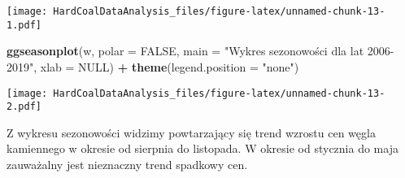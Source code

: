 \documentclass[
]{article}
\newenvironment{Shaded}{\begin{snugshade}}{\end{snugshade}}
\newcommand{\AttributeTok}[1]{\textcolor[rgb]{0.13,0.29,0.53}{#1}}
\newcommand{\ConstantTok}[1]{\textcolor[rgb]{0.56,0.35,0.01}{#1}}
\newcommand{\FunctionTok}[1]{\textcolor[rgb]{0.13,0.29,0.53}{\textbf{#1}}}
\newcommand{\NormalTok}[1]{#1}
\newcommand{\SpecialCharTok}[1]{\textcolor[rgb]{0.81,0.36,0.00}{\textbf{#1}}}
\newcommand{\StringTok}[1]{\textcolor[rgb]{0.31,0.60,0.02}{#1}}
\begin{document}
\texttt{[image: HardCoalDataAnalysis\_files/figure-latex/unnamed-chunk-13-1.pdf]}

\begin{Shaded}
\begin{Highlighting}[]
\FunctionTok{ggseasonplot}\NormalTok{(w, }\AttributeTok{polar =} \ConstantTok{FALSE}\NormalTok{, }\AttributeTok{main =} \StringTok{"Wykres sezonowości dla lat 2006{-}2019"}\NormalTok{, }\AttributeTok{xlab =} \ConstantTok{NULL}\NormalTok{) }\SpecialCharTok{+} 
  \FunctionTok{theme}\NormalTok{(}\AttributeTok{legend.position =} \StringTok{"none"}\NormalTok{)}
\end{Highlighting}
\end{Shaded}

\texttt{[image: HardCoalDataAnalysis\_files/figure-latex/unnamed-chunk-13-2.pdf]}

Z wykresu sezonowości widzimy powtarzający się trend wzrostu cen węgla
kamiennego w okresie od sierpnia do listopada. W okresie od stycznia do
maja zauważalny jest nieznaczny trend spadkowy cen.
\end{document}

